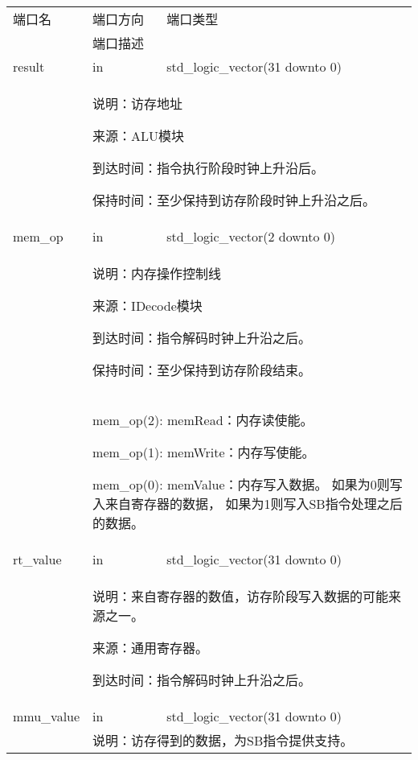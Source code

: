         \begin{tabularx}{\textwidth}{lll}
            \toprule
            端口名      & 端口方向  & 端口类型 \\
            \cmidrule(l){2-3}
            &
            \multicolumn{2}{X}{端口描述} \\
            \midrule
            result      & in   & std\_logic\_vector(31 downto 0) \\
            \cmidrule(l){2-3}
            &
            \multicolumn{2}{X}{
                说明：访存地址

                来源：ALU模块

                到达时间：指令执行阶段时钟上升沿后。

                保持时间：至少保持到访存阶段时钟上升沿之后。
            } \\
            \midrule
            mem\_op      & in    & std\_logic\_vector(2 downto 0) \\
            \cmidrule(l){2-3}
            &
            \multicolumn{2}{X}{
                说明：内存操作控制线

                来源：IDecode模块
                
                到达时间：指令解码时钟上升沿之后。

                保持时间：至少保持到访存阶段结束。
            } \\
            &
            \multicolumn{2}{X}{
                mem\_op(2): memRead：内存读使能。

                mem\_op(1): memWrite：内存写使能。

                mem\_op(0): memValue：内存写入数据。
                如果为0则写入来自寄存器的数据，%
                如果为1则写入SB指令处理之后的数据。
            } \\
            \midrule
            rt\_value   & in    & std\_logic\_vector(31 downto 0) \\
            \cmidrule(l){2-3}
            &
            \multicolumn{2}{X}{
                说明：来自寄存器的数值，访存阶段写入数据的可能来源之一。

                来源：通用寄存器。

                到达时间：指令解码时钟上升沿之后。
            } \\
            \midrule
            mmu\_value  & in    & std\_logic\_vector(31 downto 0) \\
            \cmidrule(l){2-3}
            &
            \multicolumn{2}{X}{
                说明：访存得到的数据，为SB指令提供支持。

}
\end{tabularx}
